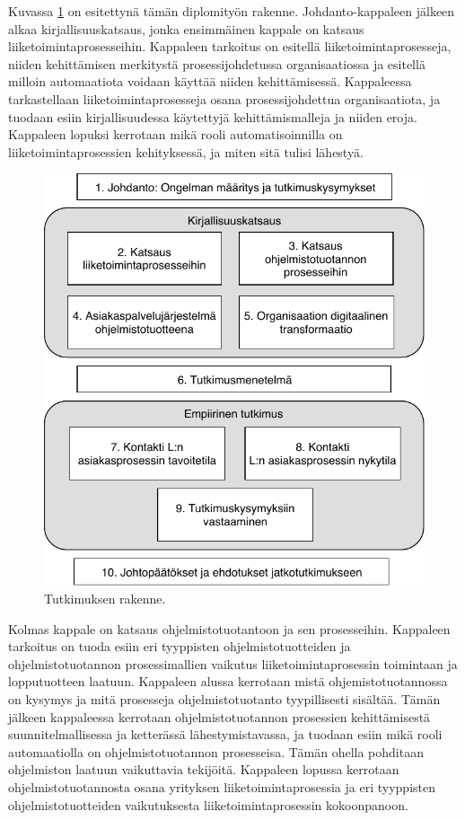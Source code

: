 \documentclass[finnish,12pt,a4paper,pdftex]{article}
\begin{document}
Kuvassa \ref{fig:rakenne} on esitettynä tämän diplomityön rakenne. Johdanto-kappaleen jälkeen alkaa kirjallisuuskatsaus, jonka ensimmäinen kappale on katsaus liiketoimintaprosesseihin. Kappaleen tarkoitus on esitellä liiketoimintaprosesseja, niiden kehittämisen merkitystä prosessijohdetussa organisaatiossa ja esitellä milloin automaatiota voidaan käyttää niiden kehittämisessä. Kappaleessa tarkastellaan liiketoimintaprosesseja osana prosessijohdettua organisaatiota, ja tuodaan esiin kirjallisuudessa käytettyjä kehittämismalleja ja niiden eroja. Kappaleen lopuksi kerrotaan mikä rooli automatisoinnilla on liiketoimintaprosessien kehityksessä, ja miten sitä tulisi lähestyä. \\

\begin{figure}[!h]
    \centering
    \includegraphics[scale=0.9]{images/tutrakenne.pdf}
    \caption{Tutkimuksen rakenne. }
    \label{fig:rakenne}
\end{figure}

Kolmas kappale on katsaus ohjelmistotuotantoon ja sen prosesseihin. Kappaleen tarkoitus on tuoda esiin eri tyyppisten ohjelmistotuotteiden ja ohjelmistotuotannon prosessimallien vaikutus liiketoimintaprosessin toimintaan ja lopputuotteen laatuun. Kappaleen alussa kerrotaan mistä ohjemistotuotannossa on kysymys ja mitä prosesseja ohjelmistotuotanto tyypillisesti sisältää. Tämän jälkeen kappaleessa kerrotaan ohjelmistotuotannon prosessien kehittämisestä suunnitelmallisessa ja ketterässä lähestymistavassa, ja tuodaan esiin mikä rooli automaatiolla on ohjelmistotuotannon prosesseisa. Tämän ohella pohditaan ohjelmiston laatuun vaikuttavia tekijöitä. Kappaleen lopussa kerrotaan ohjelmistotuotannosta osana yrityksen liiketoimintaprosessia ja eri tyyppisten ohjelmistotuotteiden vaikutuksesta liiketoimintaprosessin kokoonpanoon. \\
\end{document}
